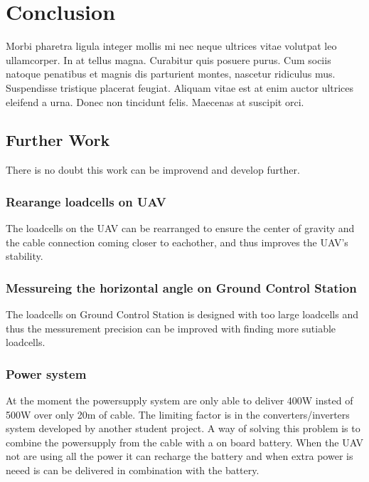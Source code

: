 \chapter{Conclusion}
Morbi pharetra ligula integer mollis mi nec neque ultrices vitae volutpat leo ullamcorper. In at tellus magna. Curabitur quis posuere purus. Cum sociis natoque penatibus et magnis dis parturient montes, nascetur ridiculus mus. Suspendisse tristique placerat feugiat. Aliquam vitae est at enim auctor ultrices eleifend a urna. Donec non tincidunt felis. Maecenas at suscipit orci.

\section{Further Work}
There is no doubt this work can be improvend and develop further. 

\subsection*{Rearange loadcells on UAV}
The loadcells on the UAV can be rearranged to ensure the center of gravity and the cable connection coming closer to eachother, and thus improves the UAV's stability.

\subsection*{Messureing the horizontal angle on Ground Control Station}
The loadcells on Ground Control Station is designed with too large loadcells and thus the messurement precision can be improved with finding more sutiable loadcells.

\subsection*{Power system}
At the moment the powersupply system are only able to deliver 400W insted of 500W over only 20m of cable. The limiting factor is in the converters/inverters system developed by another student project. A way of solving this problem is to combine the powersupply from the cable with a on board battery. When the UAV not are using all the power it can recharge the battery and when extra power is neeed is can be delivered in combination with the battery.